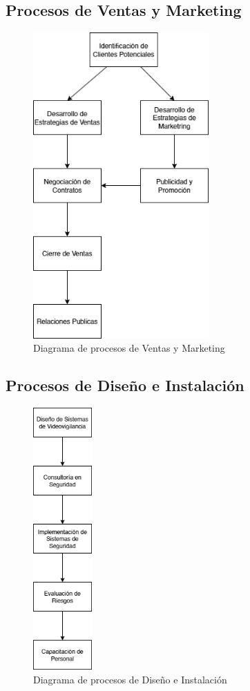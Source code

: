 \documentclass{report}
\begin{document}
        \subsection*{Procesos de Ventas y Marketing}
          \begin{figure}[H]
            \centering
            \includegraphics[width=0.6\textwidth]{./img/pro_ven_mark.png}
            \caption{Diagrama de procesos de Ventas y Marketing}
          \end{figure}
        \clearpage\subsection*{Procesos de Diseño e Instalación}
          \begin{figure}[H]
            \centering
            \includegraphics[width=0.2\textwidth]{./img/pro_dis_con.png}
            \caption{Diagrama de procesos de Diseño e Instalación}
          \end{figure}
\end{document}
